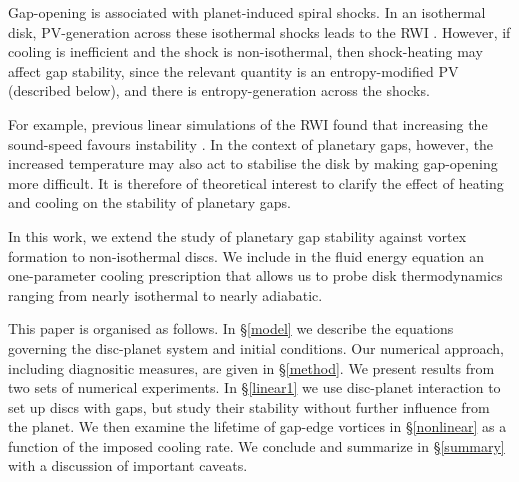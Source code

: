 \documentclass[useAMS,usenatbib]{mn2e}
\begin{document}
Gap-opening is associated with planet-induced spiral shocks. In an
isothermal disk, PV-generation across these isothermal shocks leads to
the RWI \citep{koller03,li05,valborro07,lin10}.    
However, if cooling is inefficient and the shock is non-isothermal,
then shock-heating may affect gap stability, since the
relevant quantity is an entropy-modified PV (described below), and
there is entropy-generation across the shocks. 

For example, previous
linear simulations of the RWI found 
that increasing the sound-speed favours instability \citep{li00,lin13}. In the context of
planetary gaps, however, the increased temperature may also act to
stabilise the disk by making gap-opening more difficult. It is 
therefore of theoretical interest to clarify the effect of heating and
cooling on the stability of planetary gaps. 

In this work, we extend the study of planetary gap stability against
vortex formation to non-isothermal discs. We include in the fluid energy
equation an one-parameter cooling prescription that allows us to probe
disk thermodynamics ranging from nearly isothermal to nearly
adiabatic.      

This paper is organised as follows. In \S\ref{model} we describe the
equations governing the disc-planet system and initial conditions. Our
numerical approach, including diagnositic measures, are given in
\S\ref{method}. We present results from two sets of numerical
experiments. In \S\ref{linear1} we use disc-planet interaction to set
up discs with gaps, but study their stability without further
influence from the planet. %
We then examine the lifetime of gap-edge vortices in \S\ref{nonlinear}
as a function of the imposed cooling rate. We conclude and summarize
in \S\ref{summary} with a discussion of important caveats. 





%






\appendix
%
%
\end{document}
